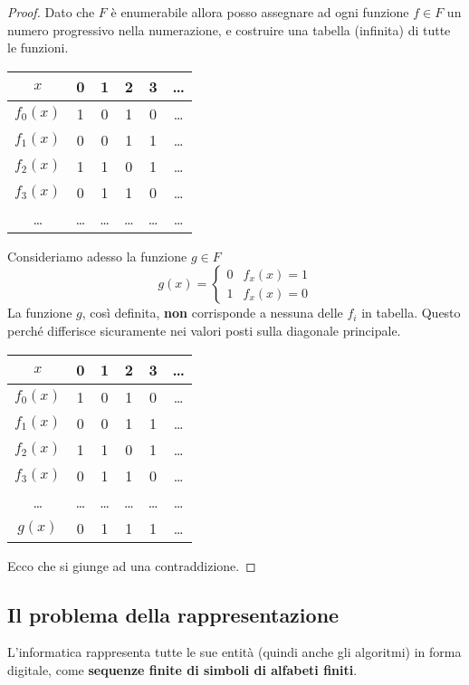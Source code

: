 \begin{theorem}
\begin{proof}
		Dato che $F$ \`e enumerabile allora posso assegnare ad ogni funzione $f \in F$ un numero progressivo nella
		numerazione, e costruire una tabella (infinita) di tutte le funzioni.
		\begin{center}
			\begin{tabular}{c | c c c c c}
				$x$      & 0     & 1     & 2     & 3     & \dots \\
				\hline
				$f_0(x)$ & 1     & 0     & 1     & 0     & \dots \\
				$f_1(x)$ & 0     & 0     & 1     & 1     & \dots \\
				$f_2(x)$ & 1     & 1     & 0     & 1     & \dots \\
				$f_3(x)$ & 0     & 1     & 1     & 0     & \dots \\
				\dots    & \dots & \dots & \dots & \dots & \dots
			\end{tabular}
		\end{center}
		Consideriamo adesso la funzione $g \in F$
		\[
			g(x) = \begin{cases}
				0 & f_x (x) = 1 \\
				1 & f_x (x) = 0
			\end{cases}
		\]
		La funzione $g$, cos\`i definita, \textbf{non} corrisponde a nessuna delle $f_i$ in tabella. Questo perch\'e
		differisce sicuramente nei valori posti sulla diagonale principale.
		\begin{center}
			\begin{tabular}{c | c c c c c}
				$x$      & 0     & 1     & 2     & 3     & \dots \\
				\hline
				$f_0(x)$ & 1     & 0     & 1     & 0     & \dots \\
				$f_1(x)$ & 0     & 0     & 1     & 1     & \dots \\
				$f_2(x)$ & 1     & 1     & 0     & 1     & \dots \\
				$f_3(x)$ & 0     & 1     & 1     & 0     & \dots \\
				\dots    & \dots & \dots & \dots & \dots & \dots \\
				\hline
				$g(x)$   & 0     & 1     & 1     & 1     & \dots
			\end{tabular}
		\end{center}
		Ecco che si giunge ad una contraddizione.
	\end{proof}
\end{theorem}

\subsection{Il problema della rappresentazione}
L'informatica rappresenta tutte le sue entit\`a (quindi anche gli algoritmi) in forma digitale, come
\textbf{sequenze finite di simboli di alfabeti finiti}.

